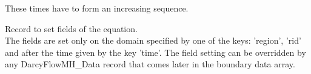 \begin{RecordType}{}{}{}{}
{{{These times have to form an increasing sequence.}}}\end{RecordType}\begin{RecordType}{}{}{}{}{{{Record to set fields of the equation.}\\{
The fields are set only on the domain specified by one of the keys: 'region', 'rid'}\\{
and after the time given by the key 'time'. The field setting can be overridden by}\\{
 any DarcyFlowMH\_Data record that comes later in the boundary data array.}}}
\end{RecordType}
